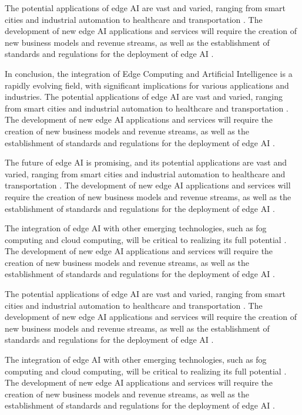 \documentclass[11pt,a4paper]{article}
\begin{document}
The potential applications of edge AI are vast and varied, ranging from smart cities and industrial automation to healthcare and transportation \cite{arxiv:2510.10166}. The development of new edge AI applications and services will require the creation of new business models and revenue streams, as well as the establishment of standards and regulations for the deployment of edge AI \cite{arxiv:2501.14823}. 

In conclusion, the integration of Edge Computing and Artificial Intelligence is a rapidly evolving field, with significant implications for various applications and industries. The potential applications of edge AI are vast and varied, ranging from smart cities and industrial automation to healthcare and transportation \cite{arxiv:2502.15775}. The development of new edge AI applications and services will require the creation of new business models and revenue streams, as well as the establishment of standards and regulations for the deployment of edge AI \cite{arxiv:2403.15665}. 

The future of edge AI is promising, and its potential applications are vast and varied, ranging from smart cities and industrial automation to healthcare and transportation \cite{arxiv:2402.13056}. The development of new edge AI applications and services will require the creation of new business models and revenue streams, as well as the establishment of standards and regulations for the deployment of edge AI \cite{arxiv:2309.05416}. 

The integration of edge AI with other emerging technologies, such as fog computing and cloud computing, will be critical to realizing its full potential \cite{arxiv:2404.13411}. The development of new edge AI applications and services will require the creation of new business models and revenue streams, as well as the establishment of standards and regulations for the deployment of edge AI \cite{arxiv:1906.08452}. 

The potential applications of edge AI are vast and varied, ranging from smart cities and industrial automation to healthcare and transportation \cite{arxiv:2201.00242}. The development of new edge AI applications and services will require the creation of new business models and revenue streams, as well as the establishment of standards and regulations for the deployment of edge AI \cite{arxiv:1909.08747}. 

The integration of edge AI with other emerging technologies, such as fog computing and cloud computing, will be critical to realizing its full potential \cite{arxiv:2111.10076}. The development of new edge AI applications and services will require the creation of new business models and revenue streams, as well as the establishment of standards and regulations for the deployment of edge AI \cite{arxiv:2106.10063}. 
\end{document}
